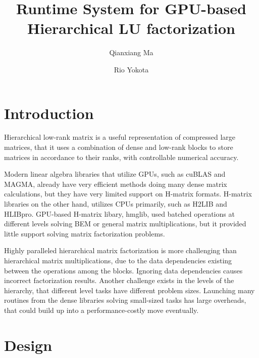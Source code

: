 \documentclass[sigconf]{acmart}
\begin{document}
\title{Runtime System for GPU-based Hierarchical LU factorization}

\author{Qianxiang Ma}

\author{Rio Yokota}

\maketitle

\section{Introduction}

Hierarchical low-rank matrix is a useful representation of compressed large matrices, that it uses a combination of dense and low-rank blocks to store matrices in accordance to their ranks, with controllable numerical accuracy.\cite{Hackbusch15}

Modern linear algebra libraries that utilize GPUs, such as cuBLAS and MAGMA\cite{dghklty14}, already have very efficient methods doing many dense matrix calculations, but they have very limited support on H-matrix formats. H-matrix libraries on the other hand, utilizes CPUs primarily, such as H2LIB and HLIBpro\cite{Börm2019, Kriemann13}. GPU-based H-matrix libary, hmglib\cite{2018arXiv180611558H}, used batched operations at different levels solving BEM or general matrix multiplications, but it provided little support solving matrix factorization problems.

Highly paralleled hierarchical matrix factorization is more challenging than hierarchical matrix multiplications, due to the data dependencies existing between the operations among the blocks. Ignoring data dependencies causes incorrect factorization results. Another challenge exists in the levels of the hierarchy, that different level tasks have different problem sizes. Launching many routines from the dense libraries solving small-sized tasks has large overheads, that could build up into a performance-costly move eventually.

\section{Design}
\end{document}
